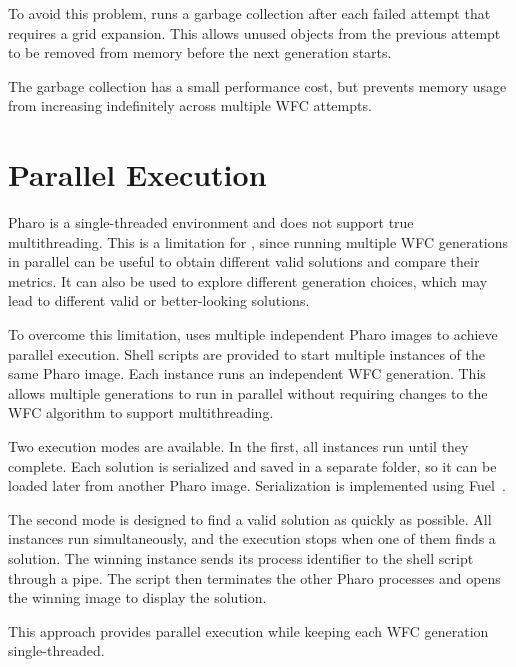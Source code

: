 \documentclass[../../main.tex]{subfiles}
\begin{document}
To avoid this problem, \wassis runs a garbage collection after each failed attempt that requires a grid expansion. This allows unused objects from the previous attempt to be removed from memory before the next generation starts.

The garbage collection has a small performance cost, but prevents memory usage from increasing indefinitely across multiple WFC attempts.

\section{Parallel Execution}

Pharo is a single-threaded environment and does not support true multithreading. This is a limitation for \wassis, since running multiple WFC generations in parallel can be useful to obtain different valid solutions and compare their metrics. It can also be used to explore different generation choices, which may lead to different valid or better-looking solutions.

To overcome this limitation, \wassis uses multiple independent Pharo images to achieve parallel execution. Shell scripts are provided to start multiple instances of the same Pharo image. \clearpage Each instance runs an independent WFC generation. This allows multiple generations to run in parallel without requiring changes to the WFC algorithm to support multithreading.

Two execution modes are available. In the first, all instances run until they complete. Each solution is serialized and saved in a separate folder, so it can be loaded later from another Pharo image. Serialization is implemented using Fuel~.

The second mode is designed to find a valid solution as quickly as possible. All instances run simultaneously, and the execution stops when one of them finds a solution. The winning instance sends its process identifier to the shell script through a pipe. The script then terminates the other Pharo processes and opens the winning image to display the solution.

This approach provides parallel execution while keeping each WFC generation single-threaded.



\end{document}

